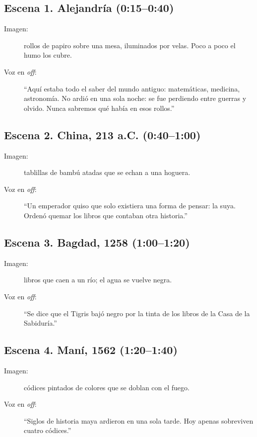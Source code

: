 \documentclass[11pt,a4paper,twoside,openright]{book}
\begin{document}
\subsection*{Escena 1. Alejandría (0:15--0:40)}
\begin{description}
  \item[Imagen:] rollos de papiro sobre una mesa, iluminados por velas. Poco a
        poco el humo los cubre.
  \item[Voz en \textit{off}:] ``Aquí estaba todo el saber del mundo antiguo:
        matemáticas, medicina, astronomía. No ardió en una sola noche: se fue
        perdiendo entre guerras y olvido. Nunca sabremos qué había en esos rollos.''
\end{description}

\subsection*{Escena 2. China, 213 a.C. (0:40--1:00)}
\begin{description}
  \item[Imagen:] tablillas de bambú atadas que se echan a una hoguera.
  \item[Voz en \textit{off}:] ``Un emperador quiso que solo existiera una forma
        de pensar: la suya. Ordenó quemar los libros que contaban otra historia.''
\end{description}

\subsection*{Escena 3. Bagdad, 1258 (1:00--1:20)}
\begin{description}
  \item[Imagen:] libros que caen a un río; el agua se vuelve negra.
  \item[Voz en \textit{off}:] ``Se dice que el Tigris bajó negro por la tinta de
        los libros de la Casa de la Sabiduría.''
\end{description}

\subsection*{Escena 4. Maní, 1562 (1:20--1:40)}
\begin{description}
  \item[Imagen:] códices pintados de colores que se doblan con el fuego.
  \item[Voz en \textit{off}:] ``Siglos de historia maya ardieron en una sola
        tarde. Hoy apenas sobreviven cuatro códices.''
\end{description}
\end{document}
